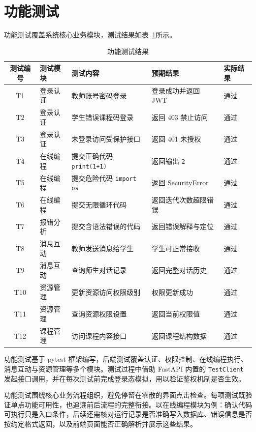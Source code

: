 \section{功能测试}
功能测试覆盖系统核心业务模块，测试结果如表~\ref{tab:func-test}所示。

\begin{table}[htbp]
  \centering
  \caption{功能测试结果}
  \label{tab:func-test}
  \begin{tabular}{cp{3cm}p{4cm}p{3cm}p{3cm}}
    \toprule
    测试编号 & 测试模块 & 测试内容 & 预期结果 & 实际结果 \\
    \midrule
    T1 & 登录认证 & 教师账号密码登录 & 登录成功并返回 JWT & 通过 \\
    T2 & 登录认证 & 学生错误课程码登录 & 返回 403 禁止访问 & 通过 \\
    T3 & 登录认证 & 未登录访问受保护接口 & 返回 401 未授权 & 通过 \\
    T4 & 在线编程 & 提交正确代码 \texttt{print(1+1)} & 返回输出 \texttt{2} & 通过 \\
    T5 & 在线编程 & 提交危险代码 \texttt{import os} & 返回 SecurityError & 通过 \\
    T6 & 在线编程 & 提交无限循环代码 & 返回迭代次数超限错误 & 通过 \\
    T7 & 报错分析 & 提交含语法错误的代码 & 返回错误解释与定位 & 通过 \\
    T8 & 消息互动 & 教师发送消息给学生 & 学生可正常接收 & 通过 \\
    T9 & 消息互动 & 查询师生对话记录 & 返回完整对话历史 & 通过 \\
    T10 & 资源管理 & 更新资源访问权限级别 & 权限更新成功 & 通过 \\
    T11 & 资源管理 & 查询资源权限设置 & 返回当前权限值 & 通过 \\
    T12 & 课程管理 & 访问课程内容接口 & 返回课程结构数据 & 通过 \\
    \bottomrule
  \end{tabular}
\end{table}

功能测试基于 pytest 框架编写，后端测试覆盖认证、权限控制、在线编程执行、消息互动与资源管理等多个模块。测试过程中借助 FastAPI 内置的 \texttt{TestClient} 发起接口调用，并在每次测试前完成登录态模拟，用以验证鉴权机制是否生效。

功能测试围绕核心业务流程组织，避免停留在零散的界面点击检查。每项测试既验证单点功能可用性，也追溯前后流程的完整衔接。以在线编程模块为例：确认代码可执行只是入口条件，后续还需核对运行记录是否准确写入数据库、错误信息是否按约定格式返回，以及前端页面能否正确解析并展示这些结果。

